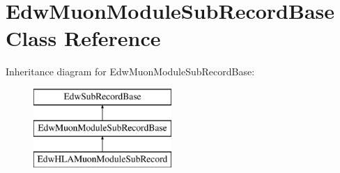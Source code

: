 \hypertarget{class_edw_muon_module_sub_record_base}{
\section{EdwMuonModuleSubRecordBase Class Reference}
\label{class_edw_muon_module_sub_record_base}
}
Inheritance diagram for EdwMuonModuleSubRecordBase:\begin{figure}[H]
\begin{center}
\leavevmode
\includegraphics[height=3cm]{class_edw_muon_module_sub_record_base}
\end{center}
\end{figure}
